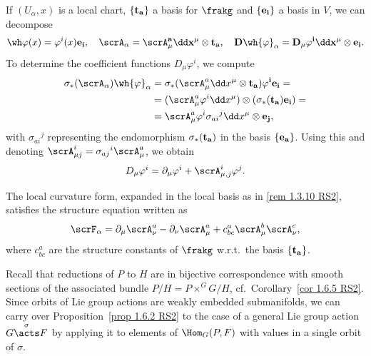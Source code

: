\begin{rem}\label{rem 1.4.14 RS2}
    If $(U_\alpha,x)$ is a local chart, $\{\bf{t}_a\}$ a basis for $\frakg$ and $\{\bf{e}_i\}$ a basis in $V$, we can decompose
    \[\wh\varphi(x)=\varphi^i(x)\bf{e}_i,\quad \scrA_\alpha=\scrA_\mu^a\dd x^\mu\otimes \bf{t}_a,\quad D\wh{\varphi}_\alpha=D_\mu \varphi^i\dd x^\mu\otimes \bf{e}_i.\]
    To determine the coefficient functions $D_\mu\varphi^i$, we compute
    \begin{align}
        \sigma_\ast(\scrA_\alpha)\wh{\varphi}_\alpha&=\sigma_\ast(\scrA_\mu^a\dd x^\mu\otimes\bf{t}_a)\varphi^i\bf{e}_i=\notag\\
        &=(\scrA_\mu^a\varphi^i\dd x^\mu)\otimes(\sigma_\ast(\bf{t}_a)\bf{e}_i)=\notag\\
        &=\scrA_\mu^a\varphi^i\sigma_{ai}{}^j\dd x^\mu\otimes \bf{e}_j,
    \end{align}
    with $\sigma_{ai}{}^j$ representing the endomorphism $\sigma_\ast(\bf{t}_a)$ in the basis $\{\bf{e}_a\}$. Using this and denoting $\scrA_{\mu j}^i=\sigma_{aj}{}^i\scrA_\mu^a$, we obtain 
    \[D_\mu\varphi^i=\partial_\mu\varphi^i+\scrA_{\mu,j}^i \varphi^j.\]
\end{rem}

\begin{rem}
    The local curvature form, expanded in the local basis as in \ref{rem 1.3.10 RS2}, satisfies the structure equation written as
    \[\scrF_\alpha=\partial_\mu \scrA_\nu^a-\partial_\nu\scrA_\mu^a+c^a_{bc}\scrA_\mu^b\scrA_\nu^c,\]
    where $c^a_{bc}$ are the structure constants of $\frakg$ w.r.t.\ the basis $\{\bf{t}_a\}$.
\end{rem}

Recall that reductions of $P$ to $H$ are in bijective correspondence with smooth sections of the associated bundle $P\slash H=P\times^G G\slash H$, cf.\ Corollary~\ref{cor 1.6.5 RS2}. Since orbits of Lie group actions are weakly embedded submanifolds, we can carry over Proposition~\ref{prop 1.6.2 RS2} to the case of a general Lie group action $G\overset{\sigma}{\acts}F$ by applying it to elements of $\Hom_G(P,F)$ with values in a single orbit of $\sigma$.

